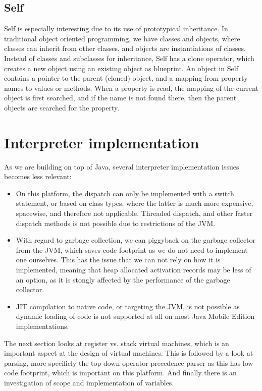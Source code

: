 \documentclass[11pt]{report}
\begin{document}
\subsection{Self}
\label{survey-self}
Self \cite{self} is especially interesting due to its use of prototypical inheritance.
In traditional object oriented programming, we have classes and objects, where classes can inherit from other classes, and objects are instantiations of classes.
Instead of classes and subclasses for inheritance, Self has a clone operator, which creates a new object using an existing object as blueprint.
An object in Self contains a pointer to the parent (cloned) object, and a mapping from property names to values or methods. When a property is read, the mapping of the current object is first searched, and if the name is not found there, then the parent objects are searched for the property.

\section{Interpreter implementation}
\label{interpreter-implementation}

As we are building on top of Java, 
several interpreter implementation issues
becomes less relevant:
\begin{itemize}
\item On this platform, the dispatch can only be implemented 
with a switch statement, or based on class types, where the
latter is much more expensive, spacewise, and therefore not applicable.
Threaded dispatch, and other faster dispatch methods is not possible
due to restrictions of the JVM.
\item With regard to garbage collection, we can piggyback on the garbage collector from the JVM, which saves code footprint as we do not need to implement one ourselves. This has the issue that we can not rely on how it is implemented, meaning that heap allocated activation records may be less of an option, as it is stongly affected by the performance of the garbage collector.
\item JIT compilation to native code, or targeting the JVM, is not possible as dynamic loading of code is not supported at all on most Java Mobile Edition implementations.
\end{itemize}

The next section looks at register vs. stack virtual machines, which is an important aspect at the design of virtual machines. This is followed by a look at parsing, more specificly the top down operator precedence parser as this has low code footprint, which is important on this platform. And finally there is an investigation of scope and implementation of variables.
\end{document}
